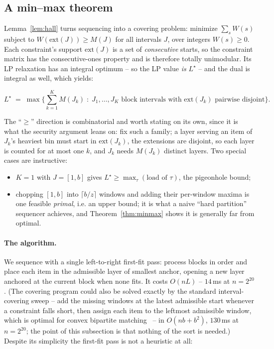 \subsection{A min--max theorem}

Lemma~\ref{lem:hall} turns sequencing into a covering problem: minimize
$\sum_s W(s)$ subject to $W(\mathrm{ext}(J)) \ge M(J)$ for all intervals $J$,
over integers $W(s) \ge 0$. Each constraint's support $\mathrm{ext}(J)$ is a
set of \emph{consecutive} starts, so the constraint matrix has the
consecutive-ones property and is therefore totally unimodular. Its LP
relaxation has an integral optimum -- so the LP value \emph{is} $L^\star$ --
and the dual is integral as well, which yields:

\begin{theorem}
\label{thm:minmax}
\[
  L^\star \;=\; \max\Big\{ \textstyle\sum_{k=1}^{K} M(J_k) \;:\;
     J_1,\dots,J_K \text{ block intervals with } \mathrm{ext}(J_k)
     \text{ pairwise disjoint} \Big\}.
\]
\end{theorem}

The ``$\ge$'' direction is combinatorial and worth stating on its own, since it
is what the security argument leans on: fix such a family; a layer serving an
item of $J_k$'s heaviest bin must start in $\mathrm{ext}(J_k)$, the extensions
are disjoint, so each layer is counted for at most one $k$, and $J_k$ needs
$M(J_k)$ distinct layers. Two special cases are instructive:
\begin{itemize}
  \item $K = 1$ with $J = [1,b]$ gives $L^\star \ge \max_\tau (\text{load of }
        \tau)$, the pigeonhole bound;
  \item chopping $[1,b]$ into $\lceil b/z \rceil$ windows and adding their
        per-window maxima is one feasible \emph{primal}, i.e. an upper bound;
        it is what a naive ``hard partition'' sequencer achieves, and
        Theorem~\ref{thm:minmax} shows it is generally far from optimal.
\end{itemize}

\paragraph{The algorithm.}
We sequence with a single left-to-right first-fit pass: process blocks in
order and place each item in the admissible layer of smallest anchor, opening
a new layer anchored at the current block when none fits. It costs $O(n L)$
-- $14$\,ms at $n = 2^{20}$. (The covering program could also be solved
exactly by the standard interval-covering sweep -- add the missing windows at
the latest admissible start whenever a constraint falls short, then assign
each item to the leftmost admissible window, which is optimal for convex
bipartite matching~\cite{Glover67} -- in $O(nb + b^2)$, $130$\,ms at
$n = 2^{20}$; the point of this subsection is that nothing of the sort is
needed.) Despite its simplicity the first-fit pass is not a heuristic at all:

